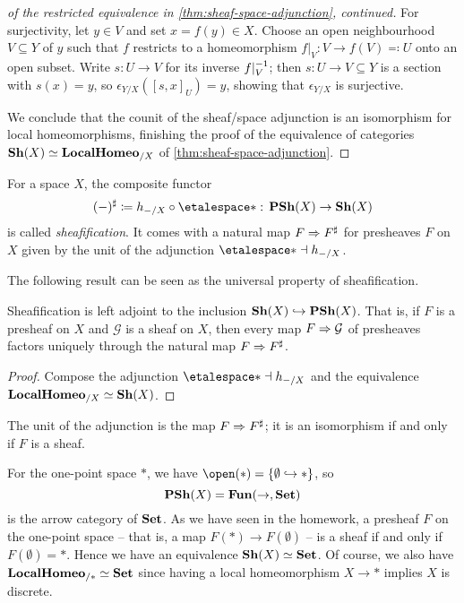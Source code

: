 \begin{proof}[of the restricted equivalence in \cref{thm:sheaf-space-adjunction}, continued]
For surjectivity, let \(y\in V\) and set \(x=f(y)\in X\).
Choose an open neighbourhood \(V\subseteq Y\) of \(y\) such that \(f\) restricts to a homeomorphism \(f|_V\colon V\to f(V) \eqcolon U\) onto an open subset.
Write \(s\colon U\to V\) for its inverse \(f|_V^{-1}\); then \(s\colon U\to V\subseteq Y\) is a section with \(s(x)=y\), so \(\epsilon_{Y/X}([s,x]_U)=y\), showing that \(\epsilon_{Y/X}\) is surjective.

We conclude that the counit of the sheaf/space adjunction is an isomorphism for local homeomorphisms, finishing the proof of the equivalence of categories \(\operatorname{\mathbf{Sh}}(X)\simeq\mathbf{LocalHomeo}_{/X}\) of \cref{thm:sheaf-space-adjunction}.
\end{proof}

\begin{defn}
For a space $X$, the composite functor
\[ (-)^\sharp \coloneq h_{-/X} \circ \etalespace* \colon \catPresheaf(X)\to\catSheaf(X) \]
is called \emph{sheafification}.
It comes with a natural map $F\Rightarrow F^\sharp$ for presheaves $F$ on $X$ given by the unit of the adjunction $\etalespace*\leftadj h_{-/X}$.
\end{defn}

The following result can be seen as the universal property of sheafification.

\begin{cor}\label{cor:sheafification-left-adjoint-to-inclusion}
Sheafification is left adjoint to the inclusion $\operatorname{\mathbf{Sh}}(X)\hookrightarrow\operatorname{\mathbf{PSh}}(X)$.
That is, if $F$ is a presheaf on $X$ and $\mathcal G$ is a sheaf on $X$, then every map $F\Rightarrow \mathcal G$ of presheaves factors uniquely through the natural map $F\Rightarrow F^\sharp$.
\end{cor}
\begin{proof}
Compose the adjunction $\etalespace*\leftadj h_{-/X}$ and the equivalence $\mathbf{LocalHomeo}_{/X}\simeq\operatorname{\mathbf{Sh}}(X)$.
\end{proof}

The unit of the adjunction is the map $F\Rightarrow F^\sharp$; it is an isomorphism if and only if $F$ is a sheaf.

\begin{exmp}\label{exmp:sheaf-on-point-set}
For the one-point space $*$, we have $\open(*) = \{\emptyset\hookrightarrow *\}$, so
\[ \operatorname{\mathbf{PSh}}(X) = \operatorname{\mathbf{Fun}}(\mathord{\to},\mathbf{Set}) \]
is the arrow category of $\mathbf{Set}$.
As we have seen in the homework, a presheaf $F$ on the one-point space -- that is, a map $F(*)\to F(\emptyset)$ -- is a sheaf if and only if $F(\emptyset)=*$.
Hence we have an equivalence $\operatorname{\mathbf{Sh}}(X)\simeq\mathbf{Set}$.
Of course, we also have $\mathbf{LocalHomeo}_{/*} \simeq\mathbf{Set}$ since having a local homeomorphism $X\to *$ implies $X$ is discrete.
\end{exmp}


